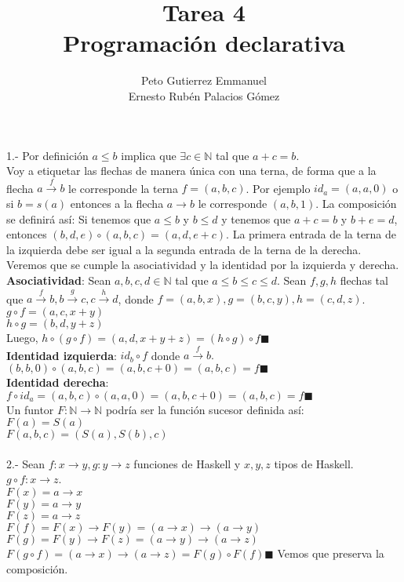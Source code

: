 \documentclass{article}
\title{Tarea 4 \\Programación declarativa}
\author{Peto Gutierrez Emmanuel \\ Ernesto Rubén Palacios Gómez}
\begin{document}
\maketitle

1.- Por definición $a \leq b$ implica que $\exists c \in  \mathbb{N}$ tal que $a+c=b$.\\

Voy a etiquetar las flechas de manera única con una terna, de forma que a la flecha $a \xrightarrow{f} b$ le corresponde la terna $f=(a,b,c)$. Por ejemplo $id_{a}=(a,a,0)$ o si $b=s(a)$ entonces a la flecha $a \rightarrow b$ le corresponde $(a,b,1)$. La composición se definirá así: Si tenemos que $a \leq b$ y $b \leq d$ y tenemos que $a+c=b$ y $b+e=d$, entonces $(b,d,e) \circ (a,b,c) = (a,d,e+c)$. La primera entrada de la terna de la izquierda debe ser igual a la segunda entrada de la terna de la derecha.\\

Veremos que se cumple la asociatividad y la identidad por la izquierda y derecha.\\

\textbf{Asociatividad}: Sean $a,b,c,d \in \mathbb{N}$ tal que $a \leq b \leq c \leq d$. Sean $f,g,h$ flechas tal que $a \xrightarrow{f} b, b \xrightarrow{g} c, c \xrightarrow{h} d$, donde $f=(a,b,x), g=(b,c,y), h=(c,d,z)$.\\ $g \circ f = (a,c,x+y)$ \\ $h \circ g = (b,d,y+z)$ \\
Luego, $h \circ (g \circ f) = (a,d,x+y+z) = (h \circ g) \circ f \blacksquare$ \\

\textbf{Identidad izquierda}: $id_{b} \circ f$ donde $a \xrightarrow{f} b.$ \\ $(b,b,0) \circ (a,b,c)=(a,b,c+0)=(a,b,c) = f \blacksquare$ \\

\textbf{Identidad derecha}: $f \circ id_{a} = (a,b,c) \circ (a,a,0)=(a,b,c+0)=(a,b,c)=f \blacksquare$ \\

Un funtor $F: \mathbb{N} \rightarrow \mathbb{N}$ podría ser la función sucesor definida así: \\
$F(a)=S(a)$ \\
$F(a,b,c)=(S(a),S(b),c)$ \\ \ \\

2.- Sean $f:x \rightarrow y, g:y \rightarrow z$ funciones de Haskell y $x,y,z$ tipos de Haskell. \\ $g \circ f:x \rightarrow z$. \\ $F(x)=a \rightarrow x$ \\ $F(y)=a \rightarrow y$ \\ $F(z)=a \rightarrow z$    \\ $F(f) = F(x) \rightarrow F(y) = (a \rightarrow x) \rightarrow (a \rightarrow y)$ \\ $F(g) = F(y) \rightarrow F(z) = (a \rightarrow y) \rightarrow (a \rightarrow z)$ \\ $ F(g \circ f) = (a \rightarrow x)     \rightarrow (a \rightarrow z) = F(g) \circ F(f) \blacksquare$ Vemos que preserva la composición.
\end{document}
